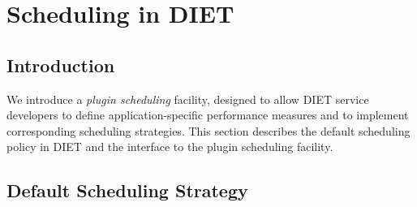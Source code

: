 

\newenvironment{code}
{\begin{list}{}{\setlength{\leftmargin}{1em}}\item\bfseries\tt}
{\end{list}}

\newenvironment{tinycode}
{\begin{list}{}{\setlength{\leftmargin}{1em}}\item\tiny\bfseries\tt}
{\end{list}}


\chapter{Scheduling in DIET}
\label{ch:plugin}

\section{Introduction}

We introduce a
\emph{plugin scheduling} facility, designed to allow DIET service
developers to define application-specific performance measures and
to implement corresponding scheduling strategies.  This section
describes the default scheduling policy in DIET and the interface to
the plugin scheduling facility.

\section{Default Scheduling Strategy}\label{sect:default_sched}

